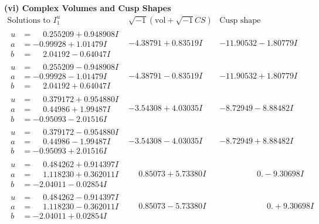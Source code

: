 \documentclass[1p]{elsarticle_modified}
\theoremstyle{definition}
\newcommand{\I}{\sqrt{-1}}
\begin{document}
\newpage\flushleft \textbf{(vi) Complex Volumes and Cusp Shapes}
$$\begin{array}{c|c|c}  
\text{Solutions to }I^u_{1}& \I (\text{vol} + \sqrt{-1}CS) & \text{Cusp shape}\\
 \hline 
\begin{aligned}
u &= \phantom{-}0.255209 + 0.948908 I \\
a &= -0.99928 + 1.01479 I \\
b &= \phantom{-}2.04192 - 0.64047 I\end{aligned}
 & -4.38791 + 0.83519 I & -11.90532 - 1.80779 I \\ \hline\begin{aligned}
u &= \phantom{-}0.255209 - 0.948908 I \\
a &= -0.99928 - 1.01479 I \\
b &= \phantom{-}2.04192 + 0.64047 I\end{aligned}
 & -4.38791 - 0.83519 I & -11.90532 + 1.80779 I \\ \hline\begin{aligned}
u &= \phantom{-}0.379172 + 0.954880 I \\
a &= \phantom{-}0.44986 + 1.99487 I \\
b &= -0.95093 - 2.01516 I\end{aligned}
 & -3.54308 + 4.03035 I & -8.72949 - 8.88482 I \\ \hline\begin{aligned}
u &= \phantom{-}0.379172 - 0.954880 I \\
a &= \phantom{-}0.44986 - 1.99487 I \\
b &= -0.95093 + 2.01516 I\end{aligned}
 & -3.54308 - 4.03035 I & -8.72949 + 8.88482 I \\ \hline\begin{aligned}
u &= \phantom{-}0.484262 + 0.914397 I \\
a &= \phantom{-}1.118230 + 0.362011 I \\
b &= -2.04011 - 0.02854 I\end{aligned}
 & \phantom{-}0.85073 + 5.73380 I & \phantom{-0.000000 } 0. - 9.30698 I \\ \hline\begin{aligned}
u &= \phantom{-}0.484262 - 0.914397 I \\
a &= \phantom{-}1.118230 - 0.362011 I \\
b &= -2.04011 + 0.02854 I\end{aligned}
 & \phantom{-}0.85073 - 5.73380 I & \phantom{-0.000000 -}0. + 9.30698 I \\ \hline\begin{aligned}

\end{aligned}
\end{array}$$
\end{document}
